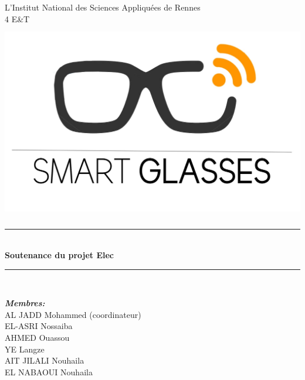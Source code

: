 \documentclass[12pt]{report}
\begin{document}




\begin{center}

\Huge{L’Institut National des Sciences Appliquées de Rennes}\\[.5cm]

\Large
4 E\&T\\[1cm] 
\includegraphics[width=15cm, height=8.75cm]{4-Images/smart.jpg}\\[0.5cm]

\sffamily
\noindent\rule{15cm}{2pt}\\[0.4cm]
\textbf{\Huge Soutenance du projet Elec}\\[0.2cm] 
\noindent\rule{15cm}{2pt}\\[1cm]
\large
\begin{minipage}[t]{.5\textwidth}
\begin{flushleft}
\emph{\textbf{\Large Membres:}}\\
AL JADD Mohammed (coordinateur)\\
EL-ASRI Nossaiba\\
AHMED Ouassou \\
YE Langze\\
AIT JILALI Nouhaila\\
EL NABAOUI Nouhaila\\
\end{flushleft}


\end{minipage}
\end{center}
\end{document}
